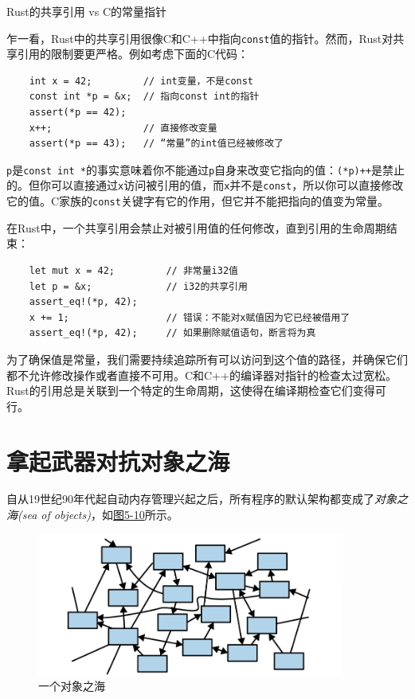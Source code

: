 \begin{shaded}
    \begin{center}
        \Large{Rust的共享引用 vs C的常量指针}
    \end{center}

    乍一看，Rust中的共享引用很像C和C++中指向\texttt{const}值的指针。然而，Rust对共享引用的限制要更严格。例如考虑下面的C代码：
    \begin{verbatim}
    int x = 42;         // int变量，不是const
    const int *p = &x;  // 指向const int的指针
    assert(*p == 42);
    x++;                // 直接修改变量
    assert(*p == 43);   // “常量”的int值已经被修改了
    \end{verbatim}

    \texttt{p}是\texttt{const int *}的事实意味着你不能通过\texttt{p}自身来改变它指向的值：\texttt{(*p)++}是禁止的。但你可以直接通过\texttt{x}访问被引用的值，而\texttt{x}并不是\texttt{const}，所以你可以直接修改它的值。C家族的\texttt{const}关键字有它的作用，但它并不能把指向的值变为常量。

    在Rust中，一个共享引用会禁止对被引用值的任何修改，直到引用的生命周期结束：
    \begin{verbatim}
    let mut x = 42;         // 非常量i32值
    let p = &x;             // i32的共享引用
    assert_eq!(*p, 42);
    x += 1;                 // 错误：不能对x赋值因为它已经被借用了
    assert_eq!(*p, 42);     // 如果删除赋值语句，断言将为真
    \end{verbatim}

    为了确保值是常量，我们需要持续追踪所有可以访问到这个值的路径，并确保它们都不允许修改操作或者直接不可用。C和C++的编译器对指针的检查太过宽松。Rust的引用总是关联到一个特定的生命周期，这使得在编译期检查它们变得可行。
\end{shaded}    

\clearpage

\section{拿起武器对抗对象之海}

自从19世纪90年代起自动内存管理兴起之后，所有程序的默认架构都变成了\emph{对象之海(sea of objects)}，如\hyperref[f5-10]{图5-10}所示。

\begin{figure}[htbp]
    \centering
    \includegraphics[width=0.9\textwidth]{../img/f5-10.png}
    \caption{一个对象之海}
    \label{f5-10}
\end{figure}

